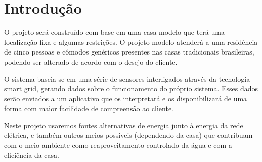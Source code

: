 \chapter{Introdução}
    \par O projeto será construído com base em uma casa modelo que terá uma localização fixa e algumas restrições. O projeto-modelo atenderá a uma residência de cinco pessoas e cômodos genéricos presentes nas casas tradicionais brasileiras, podendo ser alterado de acordo com o desejo do cliente.
    \par O sistema baseia-se em uma série de sensores interligados através da tecnologia smart grid, gerando dados sobre o funcionamento do próprio sistema. Esses dados serão enviados a um aplicativo que os interpretará e os disponibilizará de uma forma com maior facilidade de compreensão ao cliente.
    \par Neste projeto usaremos fontes alternativas de energia junto à energia da rede elétrica, e também outros meios possíveis (dependendo da casa) que contribuam com o meio ambiente como reaproveitamento controlado da água e com a eficiência da casa.
